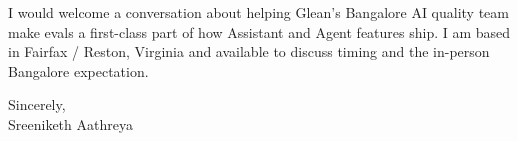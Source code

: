 \documentclass[11pt, letterpaper]{article}
\begin{document}
I would welcome a conversation about helping Glean's Bangalore AI quality team make evals a first-class part of how Assistant and Agent features ship. I am based in Fairfax / Reston, Virginia and available to discuss timing and the in-person Bangalore expectation.

Sincerely,\\[12pt]
Sreeniketh Aathreya
\end{document}
